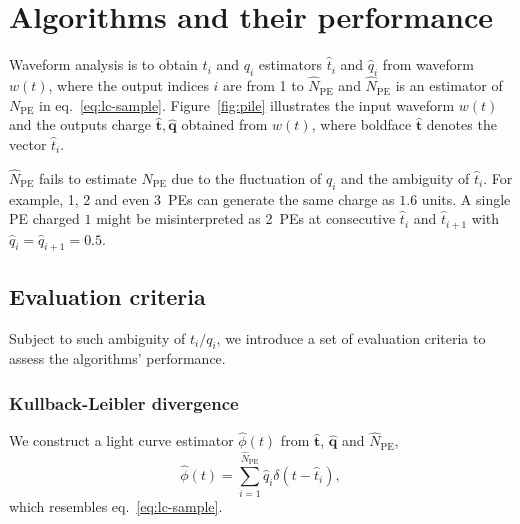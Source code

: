 \section{Algorithms and their performance}
\label{sec:algorithm}

Waveform analysis is to obtain $t_i$ and $q_i$ estimators $\hat{t}_i$ and $\hat{q}_i$ from waveform $w(t)$, where the output indices $i$ are from 1 to $\hat{N}_\mathrm{PE}$ and $\hat{N}_\mathrm{PE}$ is an estimator of $N_\mathrm{PE}$ in eq.~\eqref{eq:lc-sample}. Figure~\ref{fig:pile} illustrates the input waveform $w(t)$ and the outputs charge $\bm{\hat{t}}, \hat{\bm{q}}$ obtained from $w(t)$, where boldface $\hat{\bm{t}}$ denotes the vector $\hat{t}_i$. 

$\hat{N}_\mathrm{PE}$ fails to estimate $N_\mathrm{PE}$ due to the fluctuation of $q_i$ and the ambiguity of $\hat{t}_i$. For example, 1, 2 and even 3~PEs can generate the same charge as $1.6$ units.  A single PE charged $1$ might be misinterpreted as 2~PEs at consecutive $\hat{t}_i$ and $\hat{t}_{i+1}$ with $\hat{q}_i=\hat{q}_{i+1}=0.5$.

\subsection{Evaluation criteria}
\label{sec:criteria}
Subject to such ambiguity of $t_i/q_i$, we introduce a set of evaluation criteria to assess the algorithms' performance.

\subsubsection{Kullback-Leibler divergence}
\label{sec:pseudo}

We construct a light curve estimator $\hat{\phi}(t)$ from $\bm{\hat{t}}$, $\bm{\hat{q}}$ and $\hat{N}_\mathrm{PE}$,
\begin{equation}
  \label{eq:lc}
  \hat{\phi}(t) = \sum_{i=1}^{\hat{N}_\mathrm{PE}} \hat{q}_i\delta(t-\hat{t}_i),
\end{equation}
which resembles eq.~\eqref{eq:lc-sample}.

